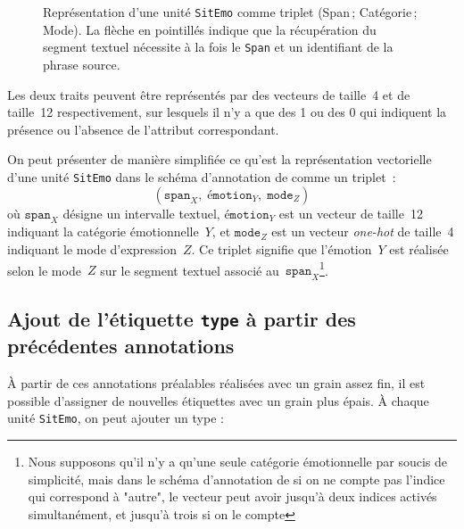 \documentclass[french, 11pt]{article}
\begin{document}
\begin{figure}[ht]
\caption{Représentation d'une unité \texttt{SitEmo} comme triplet
         {\selectfont\small (Span\,; Catégorie\,; Mode)}.
         La flèche en pointillés indique que la récupération du segment
         textuel nécessite à la fois le \texttt{Span} et un identifiant
         de la phrase source.}
\label{fig:vecteurs_sitemo}
\end{figure}


Les deux traits peuvent être représentés par des vecteurs de taille~4 et de taille~12
respectivement, sur lesquels il n'y a que des 1 ou des 0 qui indiquent
la présence ou l'absence de l'attribut correspondant.

On peut présenter de manière simplifiée ce qu'est la représentation vectorielle d'une unité
\texttt{SitEmo} dans le schéma d'annotation de \textcite{etienne2023} comme un triplet~:
\[
(\texttt{span}_{X},\; \texttt{émotion}_{Y},\; \texttt{mode}_{Z})
\]
où $\texttt{span}_{X}$ désigne un intervalle textuel, $\texttt{émotion}_{Y}$ est un vecteur de taille~12 indiquant la catégorie émotionnelle~$Y$, et $\texttt{mode}_{Z}$ est un vecteur \textit{one-hot} de taille~4 indiquant le mode d'expression~$Z$. Ce triplet signifie que l'émotion~$Y$ est réalisée selon le mode~$Z$ sur le segment textuel associé au~$\texttt{span}_{X}$\footnote{Nous supposons qu'il n'y a qu'une seule catégorie émotionnelle par soucis de simplicité, mais dans le schéma d'annotation de \textcite{etienne2023} si on ne compte pas l'indice qui correspond à "autre", le vecteur peut avoir jusqu'à deux indices activés simultanément, et jusqu'à trois si on le compte}.

\newpage
\subsection*{Ajout de l'étiquette \texttt{type} à partir des précédentes annotations}

À partir de ces annotations préalables réalisées avec un grain assez fin, il est possible d'assigner de nouvelles étiquettes avec un grain plus épais. À chaque unité \texttt{SitEmo}, on peut ajouter un type :
\end{document}
